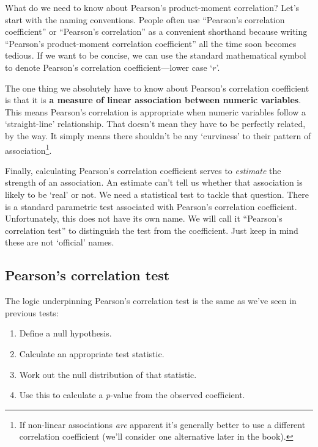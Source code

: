 \documentclass[
]{book}
\providecommand{\tightlist}{%
  \setlength{\itemsep}{0pt}\setlength{\parskip}{0pt}}
\begin{document}
What do we need to know about Pearson's product-moment correlation? Let's start with the naming conventions. People often use ``Pearson's correlation coefficient'' or ``Pearson's correlation'' as a convenient shorthand because writing ``Pearson's product-moment correlation coefficient'' all the time soon becomes tedious. If we want to be concise, we can use the standard mathematical symbol to denote Pearson's correlation coefficient---lower case `\(r\)'.

The one thing we absolutely have to know about Pearson's correlation coefficient is that it is \textbf{a measure of linear association between numeric variables}. This means Pearson's correlation is appropriate when numeric variables follow a `straight-line' relationship. That doesn't mean they have to be perfectly related, by the way. It simply means there shouldn't be any `curviness' to their pattern of association\footnote{If non-linear associations \emph{are} apparent it's generally better to use a different correlation coefficient (we'll consider one alternative later in the book).}.

Finally, calculating Pearson's correlation coefficient serves to \emph{estimate} the strength of an association. An estimate can't tell us whether that association is likely to be `real' or not. We need a statistical test to tackle that question. There is a standard parametric test associated with Pearson's correlation coefficient. Unfortunately, this does not have its own name. We will call it ``Pearson's correlation test'' to distinguish the test from the coefficient. Just keep in mind these are not `official' names.

\hypertarget{pearsons-correlation-test}{%
\subsection{Pearson's correlation test}\label{pearsons-correlation-test}}

The logic underpinning Pearson's correlation test is the same as we've seen in previous tests:

\begin{enumerate}
\def\labelenumi{\arabic{enumi}.}
\tightlist
\item
  Define a null hypothesis.
\item
  Calculate an appropriate test statistic.
\item
  Work out the null distribution of that statistic.
\item
  Use this to calculate a \emph{p}-value from the observed coefficient.
\end{enumerate}
\end{document}

